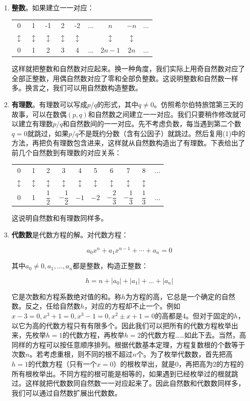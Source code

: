 \documentclass[b5paper]{ctexart}
\begin{document}
\begin{enumerate}[(1)]
\item \textbf{整数}。如果建立一一对应：

\begin{tabular}{ccccccccc}
0 & 1 & -1 & 2 & -2 & ... & $n$ & $-n$ & ... \\
$\updownarrow$ & $\updownarrow$ & $\updownarrow$ & $\updownarrow$ & $\updownarrow$ & & $\updownarrow$ & $\updownarrow$ & \\
0 & 1 &  2 & 3 &  4 & ... & $2n - 1$ & $2n$ & ... \\
\end{tabular}

这样就把整数和自然数对应起来。换一种角度，我们实际上用奇自然数对应了全部正整数，用偶自然数对应了零和全部负整数。这说明整数和自然数一样多。换言之，我们可以用自然数构造整数。

\item \textbf{有理数}。有理数可以写成$p/q$的形式，其中$q \ne 0$。仿照希尔伯特旅馆第三天的故事，可以在数偶$(p, q)$和自然数之间建立一一对应。我们只要稍作修改就可以建立有理数$p/q$和自然数间的一一对应。先不考虑负数，每当遇到第二个数$q = 0$就跳过，如果$p/q$不是既约分数（含有公因子）就跳过。然后复用(1)中的方法，再把负有理数包含进来，这样就从自然数构造出了有理数。下表给出了前几个自然数到有理数的对应关系：

\begin{tabular}{cccccccccc}
0 & 1 & 2 & 3 & 4 & 5 & 6 & 7 & 8 & ... \\
$\updownarrow$ & $\updownarrow$ & $\updownarrow$ & $\updownarrow$ & $\updownarrow$ & $\updownarrow$ & $\updownarrow$ & $\updownarrow$ & $\updownarrow$ & \\
0 & 1 & $\dfrac{1}{2}$ & $-\dfrac{1}{2}$ & $-1$ & $-2$ & $-\dfrac{2}{3}$ & $-\dfrac{1}{3}$ & $\dfrac{1}{3}$ & ... \\
\end{tabular}

这说明自然数和有理数同样多。

\item \textbf{代数数}是代数方程的解。对代数方程：

\[
a_0 x^n + a_1 x^{n-1} + \dotsb + a_n = 0
\]

其中$a_0 \ne 0, a_1, \dotsc, a_n$都是整数，构造正整数：

\[
h = n + |a_0| + |a_1| + ... + |a_n|
\]

它是次数和方程系数绝对值的和。称$h$为方程的高，它总是一个确定的自然数。反之，任给自然数$h$，对应的方程却不止一个。例如$x - 3 = 0, x^3 + 1 = 0, x^3 - 1 = 0, x^2 \pm x + 1 = 0$的高都是4。但对于固定的$h$，以它为高的代数方程只有有限多个。因此我们可以把所有的代数方程枚举出来，先枚举$h=1$的代数方程，再枚举$h=2$的代数方程……如此下去。当然，高同样的方程可以按任意顺序排列。根据代数基本定理，方程复数根的个数等于次数$n$。若考虑重根，则不同的根不超过$n$个。为了枚举代数数，首先把高$h=1$的代数方程（只有一个$x = 0$）的根枚举出，就是0，再把高为2的方程的所有根枚举出。不同方程的根可能是相等的，如果遇到已经枚举过的根就跳过。这样就把代数数同自然数一一对应起来了。因此自然数和代数数同样多，我们可以通过自然数扩展出代数数。
\end{enumerate}
\end{document}
